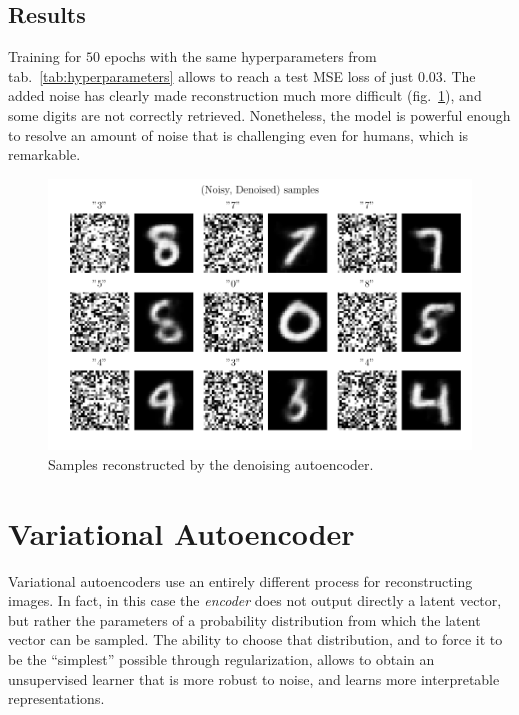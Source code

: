 \documentclass[11pt,a4paper]{scrartcl}
\newcommand{\q}[1]{``#1''}
\begin{document}
\subsection{Results}
Training for $50$ epochs with the same hyperparameters from tab.~\ref{tab:hyperparameters} allows to reach a test MSE loss of just $0.03$. The added noise has clearly made reconstruction much more difficult (fig.~\ref{fig:samples_denoising}), and some digits are not correctly retrieved. Nonetheless, the model is powerful enough to resolve an amount of noise that is challenging even for humans, which is remarkable.

\begin{figure}[H]
    \centering
    \includegraphics[width=\textwidth]{../Code/Plots/noisy_denoised}
    \caption{Samples reconstructed by the denoising autoencoder.\label{fig:samples_denoising}}
\end{figure}

\section{Variational Autoencoder\label{sec:vae}}
Variational autoencoders use an entirely different process for reconstructing images. In fact, in this case the \textit{encoder} does not output directly a latent vector, but rather the parameters of a probability distribution from which the latent vector can be sampled. The ability to choose that distribution, and to force it to be the \q{simplest} possible through regularization, allows to obtain an unsupervised learner that is more robust to noise, and learns more interpretable representations.
\end{document}
